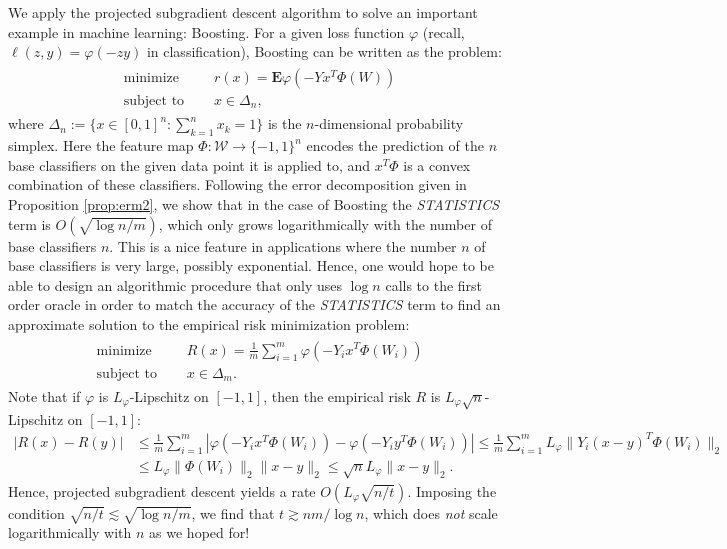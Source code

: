 We apply the projected subgradient descent algorithm to solve an important example in machine learning: Boosting. For a given loss function $\varphi$ (recall, $\ell(z,y) = \varphi(-zy)$ in classification), Boosting can be written as the problem:
\begin{align*}
	\begin{aligned}
		\text{minimize }\quad   & r(x) = \mathbf{E} \varphi(-Yx^T\Phi(W))\\
		\text{subject to }\quad & x\in \Delta_n,
	\end{aligned}
\end{align*}
where $\Delta_n := \{x\in [0,1]^n : \sum_{k=1}^n x_k = 1\}$ is the $n$-dimensional probability simplex. Here the feature map $\Phi : \mathcal{W} \rightarrow \{-1,1\}^n$ encodes the prediction of the $n$ base classifiers on the given data point it is applied to, and $x^T\Phi$ is a convex combination of these classifiers. 
Following the error decomposition given in Proposition \ref{prop:erm2}, we show that in the case of Boosting the \emph{STATISTICS} term is $O(\sqrt{\log n/m})$, which only grows logarithmically with the number of base classifiers $n$. This is a nice feature in applications where the number $n$ of base classifiers is very large, possibly exponential.
Hence, one would hope to be able to design an algorithmic procedure that only uses $\log n$ calls to the first order oracle in order to match the accuracy of the \emph{STATISTICS} term to find an approximate solution to the empirical risk minimization problem:
\begin{align*}
	\begin{aligned}
		\text{minimize }\quad   & R(x) = \frac{1}{m} \sum_{i=1}^m \varphi(-Y_ix^T\Phi(W_i))\\
		\text{subject to }\quad & x\in \Delta_m.
	\end{aligned}
\end{align*}
Note that if $\varphi$ is $L_\varphi$-Lipschitz on $[-1,1]$, then the empirical risk $R$ is $L_\varphi\sqrt{n}$-Lipschitz on $[-1,1]$:
\begin{align*}
	|R(x)-R(y)| 
	&\le \frac{1}{m} \sum_{i=1}^m | \varphi(-Y_ix^T\Phi(W_i)) - \varphi(-Y_iy^T\Phi(W_i)) |
	\le 
	\frac{1}{m} \sum_{i=1}^m L_\varphi \| Y_i(x-y)^T\Phi(W_i) \|_2\\
	&\le L_\varphi \| \Phi(W_i) \|_2 \| x-y \|_2
	\le \sqrt{n}L_\varphi \| x-y \|_2.
\end{align*}
Hence, projected subgradient descent yields a rate $O(L_\varphi\sqrt{n/t})$. Imposing the condition $\sqrt{n/t} \lesssim \sqrt{\log n/m}$, we find that $t\gtrsim nm/\log n$, which does \emph{not} scale logarithmically with $n$ as we hoped for!

